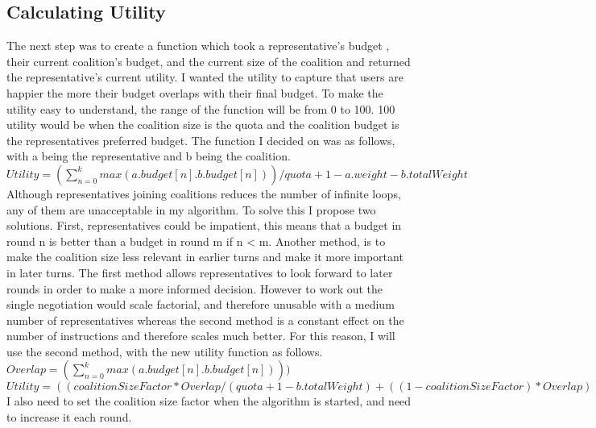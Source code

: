 \subsection{Calculating Utility}
The next step was to create a function which took a representative’s budget , their current coalition’s budget, and the current size of the coalition and returned the representative’s current utility. I wanted the utility to capture that users are happier the more their budget overlaps with their final budget. To make the utility easy to understand, the range of the function will be from 0 to 100. 100 utility would be when the coalition size is the quota and the coalition budget is the representatives preferred budget. The function I decided on was as follows, with a being the representative and b being the coalition. 
\\ $Utility = (\sum_{n=0}^k  max(a.budget[n].b.budget[n]))/ quota + 1 - a.weight - b.totalWeight$ \\
Although representatives joining coalitions reduces the number of infinite loops, any of them are unacceptable in my algorithm. To solve this I propose two solutions. First, representatives could be impatient, this means that a budget in round n is better than a budget in round m if n < m. Another method, is to make the coalition size less relevant in earlier turns and make it more important in later turns. The first method allows representatives to look forward to later rounds in order to make a more informed decision. However to work out the single negotiation would scale factorial, and therefore unusable with a medium number of representatives whereas the second method is a constant effect on the number of instructions and therefore scales much better. For this reason, I will use the second method, with the new utility function as follows.  \\
$Overlap =   (\sum_{n=0}^k  max(a.budget[n].b.budget[n])))$ \\
$Utility = ((coalitionSizeFactor * Overlap/ (quota + 1 - b.totalWeight) + ((1-coalitionSizeFactor) * Overlap)))$ \\
I also need to set the coalition size factor when the algorithm is started, and need to increase it each round.
